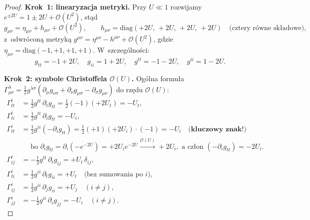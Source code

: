 \begin{proof}
\textbf{Krok~1: linearyzacja metryki.}
Przy $U \ll 1$ rozwijamy $e^{\pm 2U} = 1 \pm 2U + \mathcal{O}(U^2)$, st\k{a}d
\[
  g_{\mu\nu} = \eta_{\mu\nu} + h_{\mu\nu} + \mathcal{O}(U^2),\qquad
  h_{\mu\nu} = \mathrm{diag}(+2U,\,+2U,\,+2U,\,+2U)
  \quad\text{(cztery r\'owne sk\l{}adowe)},
\]
z~odwr\'ocon\k{a} metryk\k{a} $g^{\mu\nu} = \eta^{\mu\nu} - h^{\mu\nu} + \mathcal{O}(U^2)$,
gdzie $\eta_{\mu\nu} = \mathrm{diag}(-1,+1,+1,+1)$.
W~szczeg\'olno\'sci:
\begin{equation}\label{eq:metric-lin-tgp}
  g_{tt} = -1 + 2U,\quad
  g_{ii} =  1 + 2U,\quad
  g^{tt} = -1 - 2U,\quad
  g^{ii} =  1 - 2U.
\end{equation}

\textbf{Krok~2: symbole Christoffela $\mathcal{O}(U)$.}
Og\'olna formu\l{}a
$\Gamma^\lambda_{\mu\nu} = \tfrac{1}{2}g^{\lambda\sigma}
  (\partial_\mu g_{\nu\sigma}+\partial_\nu g_{\mu\sigma}-\partial_\sigma g_{\mu\nu})$
do rz\k{e}du $\mathcal{O}(U)$:
\begin{align*}
  \Gamma^t_{tt} &= \tfrac{1}{2}g^{tt}\,\partial_t g_{tt}
    = \tfrac{1}{2}(-1)(+2U_t) = -U_t,\\
  \Gamma^t_{ti} &= \tfrac{1}{2}g^{tt}\,\partial_i g_{tt}
    = -U_i,\\[3pt]
  \Gamma^i_{tt} &= \tfrac{1}{2}g^{ii}(-\partial_i g_{tt})
    = \tfrac{1}{2}(+1)(+2U_i) \cdot(-1) = -U_i
    \quad\textbf{(kluczowy znak!)}\\
  &\phantom{{}={}}
    \text{bo }\partial_i g_{tt} = \partial_i(-e^{-2U})
    = +2U_i e^{-2U}\xrightarrow{\mathcal{O}(U)} +2U_i,
    \text{ a cz\l{}on }(-\partial_i g_{tt}) = -2U_i.\\[3pt]
  \Gamma^t_{ij} &= -\tfrac{1}{2}g^{tt}\,\partial_t g_{ij}
    = +U_t\,\delta_{ij},\\
  \Gamma^i_{ti} &= \tfrac{1}{2}g^{ii}\,\partial_t g_{ii} = +U_t
    \quad\text{(bez sumowania po }i\text{)},\\
  \Gamma^i_{ij} &= \tfrac{1}{2}g^{ii}\,\partial_j g_{ii} = +U_j
    \quad(i\neq j),\\
  \Gamma^i_{jj} &= -\tfrac{1}{2}g^{ii}\,\partial_i g_{jj} = -U_i
    \quad(i\neq j).
\end{align*}


\end{proof}
